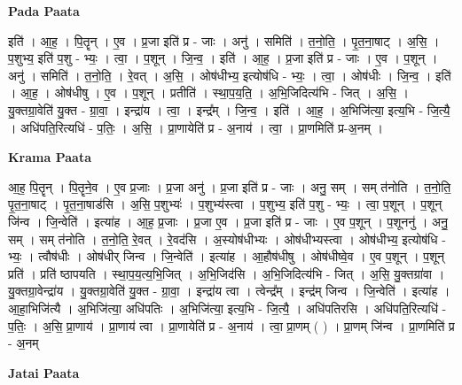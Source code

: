 \documentclass[17pt]{extarticle}
\begin{document}
\textbf{Pada Paata} \newline

इति॑ । आ॒ह॒ । पि॒तॄन् । ए॒व । प्र॒जा इति॑ प्र - जाः । अनु॑ । समिति॑ । त॒नो॒ति॒ । पृ॒त॒ना॒षाट् । अ॒सि॒ । प॒शुभ्य॒ इति॑ प॒शु - भ्यः॒ । त्वा॒ । प॒शून् । जि॒न्व॒ । इति॑ । आ॒ह॒ । प्र॒जा इति॑ प्र - जाः । ए॒व । प॒शून् । अनु॑ । समिति॑ । त॒नो॒ति॒ । रे॒वत् । अ॒सि॒ । ओष॑धीभ्य॒ इत्योष॑धि - भ्यः॒ । त्वा॒ । ओष॑धीः । जि॒न्व॒ । इति॑ । आ॒ह॒ । ओष॑धीषु । ए॒व । प॒शून् । प्रतीति॑ । स्था॒प॒य॒ति॒ । अ॒भि॒जिदित्य॑भि - जित् । अ॒सि॒ । यु॒क्तग्रा॒वेति॑ यु॒क्त - ग्रा॒वा॒ । इन्द्रा॑य । त्वा॒ । इन्द्र᳚म् । जि॒न्व॒ । इति॑ । आ॒ह॒ । अ॒भिजि॑त्या॒ इत्य॒भि - जि॒त्यै॒ । अधि॑पति॒रित्यधि॑ - प॒तिः॒ । अ॒सि॒ । प्रा॒णायेति॑ प्र - अ॒नाय॑ । त्वा॒ । प्रा॒णमिति॑ प्र-अ॒नम् ।  \newline


\textbf{Krama Paata} \newline

आ॒ह॒ पि॒तॄन् । पि॒तॄने॒व । ए॒व प्र॒जाः । प्र॒जा अनु॑ । प्र॒जा इति॑ प्र - जाः । अनु॒ सम् । सम् त॑नोति । त॒नो॒ति॒ पृ॒त॒ना॒षाट् । पृ॒त॒ना॒षाड॑सि । अ॒सि॒ प॒शुभ्यः॑ । प॒शुभ्य॑स्त्वा । प॒शुभ्य॒ इति॑ प॒शु - भ्यः॒ । त्वा॒ प॒शून् । प॒शून् जि॑न्व । जि॒न्वेति॑ । इत्या॑ह । आ॒ह॒ प्र॒जाः । प्र॒जा ए॒व । प्र॒जा इति॑ प्र - जाः । ए॒व प॒शून् । प॒शूननु॑ । अनु॒ सम् । सम् त॑नोति । त॒नो॒ति॒ रे॒वत् । रे॒वद॑सि । अ॒स्योष॑धीभ्यः । ओष॑धीभ्यस्त्वा । ओष॑धीभ्य॒ इत्योष॑धि - भ्यः॒ । त्वौष॑धीः । ओष॑धीर् जिन्व । जि॒न्वेति॑ । इत्या॑ह । आ॒हौष॑धीषु । ओष॑धीष्वे॒व । ए॒व प॒शून् । प॒शून् प्रति॑ । प्रति॑ ष्ठापयति । स्था॒प॒य॒त्य॒भि॒जित् । अ॒भि॒जिद॑सि । अ॒भि॒जिदित्य॑भि - जित् । अ॒सि॒ यु॒क्तग्रा॑वा । यु॒क्तग्रा॒वेन्द्रा॑य । यु॒क्तग्रा॒वेति॑ यु॒क्त - ग्रा॒वा॒ । इन्द्रा॑य त्वा । त्वेन्द्र᳚म् । इन्द्र॑म् जिन्व । जि॒न्वेति॑ । इत्या॑ह । आ॒हा॒भिजि॑त्यै । अ॒भिजि॑त्या॒ अधि॑पतिः । अ॒भिजि॑त्या॒ इत्य॒भि - जि॒त्यै॒ । अधि॑पतिरसि । अधि॑पति॒रित्यधि॑ - प॒तिः॒ । अ॒सि॒ प्रा॒णाय॑ । प्रा॒णाय॑ त्वा । प्रा॒णायेति॑ प्र - अ॒नाय॑ । त्वा॒ प्रा॒णम् ( ) । प्रा॒णम् जि॑न्व । प्रा॒णमिति॑ प्र - अ॒नम् \newline

\textbf{Jatai Paata} \newline
\end{document}
